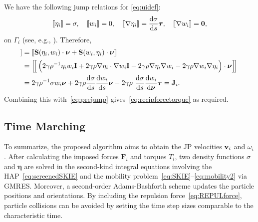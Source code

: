 \documentclass[lineno]{jfm}
\newcommand{\eeta}{\boldsymbol{\eta}}
\newcommand{\FF}{\mathbf{F}}
\newcommand{\JJ}{\mathbf{J}}
\newcommand{\nnu}{\boldsymbol{\nu}}
\newcommand{\ttau}{\boldsymbol{\tau}}
\renewcommand{\SS}{\mathbf{S}}
\newcommand{\jump}[1]{[\![ #1 ]\!]}
\begin{document}
We have the following jump relations for \eqref{eq:uidef}: 
\begin{equation}
\label{eq:DLjump}
\jump{\eta _i} = \sigma, \quad
\jump{w_i} = 0, \quad
\jump{\nabla \eta _i} = \frac{\dif \sigma}{\dif s}\ttau,\quad
\jump{\nabla w_i} = \mathbf{0},
\end{equation}
on $\Gamma_i$ (see, e.g., \cite{KlBaGrON13}). Therefore,
\begin{align*}
  \jump{{\bf T}_2 \cdot \nnu}   &= \jump{\SS(\eta _i,w_i) \cdot \nnu +
    \SS(w_i,\eta _i) \cdot \nnu} \\
  &= \Big[\!\Big[ \left( 2\gamma\rho^{-1} \eta _i w_i \mathbf{I} + 2\gamma\rho \nabla \eta _i \cdot \nabla w_i \mathbf{I} 
- 2\gamma\rho \nabla \eta _i  \nabla w_i - 2\gamma\rho \nabla w_i \nabla
  \eta _i\right) \cdot \nnu \Big]\!\Big] \\
&= 2\gamma\rho^{-1} \sigma w_i \nnu + 2\gamma\rho \frac{\dif \sigma }{\dif s}\frac{\dif w_i }{\dif s} \nnu
- 2\gamma\rho \ \frac{\dif \sigma }{\dif s} \frac{\dif w_i }{\dif \nnu} \ttau = \JJ_i.
\end{align*}
Combining this with~\eqref{eq:prejump} gives~\eqref{eq:recipforcetorque}
as required. 


\subsection{Time Marching}
To summarize, the proposed algorithm aims to obtain the JP velocities
${\bf v}_i$ and $\omega_i$. After calculating the imposed forces $\FF_i$
and torques $T_i$, two density functions $\sigma$ and  $\eeta$ are
solved in the second-kind integral equations involving the
HAP~\eqref{eq:screenedSKIE} and the mobility
problem~\eqref{eq:SKIE}--\eqref{eq:mobility2} via GMRES.
Moreover, a second-order Adams-Bashforth
scheme updates the particle positions and orientations. By including the
repulsion force~\eqref{eq:REPULforce}, particle collisions can be avoided by setting the time step
sizes comparable to the characteristic time.
\end{document}
